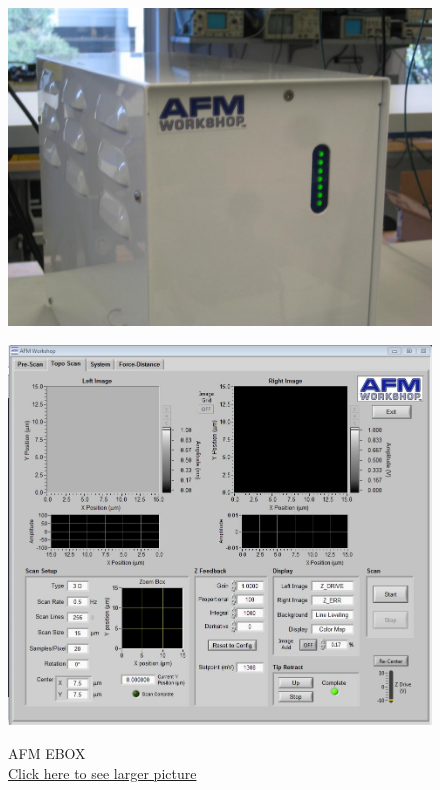 \documentclass{../lab}
\begin{document}
\begin{figure}[H]
  \href{http://experimentationlab.berkeley.edu/sites/default/files/AFMImages/9.JPG}{\includegraphics[width=\linewidth,keepaspectratio]{images/9.JPG}}
  \caption{AFM EBOX\\ \href{http://experimentationlab.berkeley.edu/sites/default/files/AFMImages/9.JPG}{Click here to see larger picture}}
  \label{fig:AFMEBox}
\endminipage\hfill
{}
  \href{http://experimentationlab.berkeley.edu/sites/default/files/AFMImages/toposcan.JPG}{\includegraphics[width=\linewidth,keepaspectratio]{images/toposcan.JPG}}

\end{figure}
\end{document}
